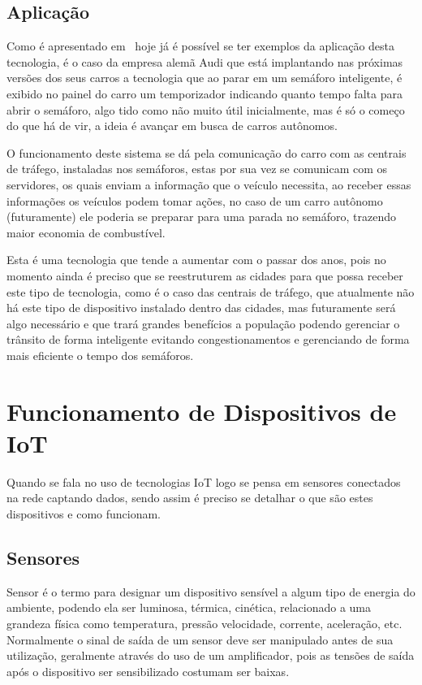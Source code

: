 \subsection{Aplicação}
\label{subsec:aplicacao}
Como é apresentado em~\cite{tecmundo} hoje já é possível se ter exemplos da aplicação desta tecnologia, é o caso da empresa alemã Audi que está implantando nas próximas versões dos seus carros a tecnologia que ao parar em um semáforo inteligente, é exibido no painel do carro um temporizador indicando quanto tempo falta para abrir o semáforo, algo tido como não muito útil inicialmente, mas é só o começo do que há de vir, a ideia é avançar em busca de carros autônomos. 

O funcionamento deste sistema se dá pela comunicação do carro com as centrais de tráfego, instaladas nos semáforos, estas por sua vez se comunicam com os servidores, os quais enviam a informação que o veículo necessita, ao receber essas informações os veículos podem tomar ações, no caso de um carro autônomo (futuramente) ele poderia se preparar para uma parada no semáforo, trazendo maior economia de combustível.

Esta é uma tecnologia que tende a aumentar com o passar dos anos, pois no momento ainda é preciso que se reestruturem as cidades para que possa receber este tipo de tecnologia, como é o caso das centrais de tráfego, que atualmente não há este tipo de dispositivo instalado dentro das cidades, mas futuramente será algo necessário e que trará grandes benefícios a população podendo gerenciar o trânsito de forma inteligente evitando congestionamentos e gerenciando de forma mais eficiente o tempo dos semáforos.

\section{Funcionamento de Dispositivos de IoT}
\label{sec:dispositivosiot}
Quando se fala no uso de tecnologias IoT logo se pensa em sensores conectados na rede captando dados, sendo assim é preciso se detalhar o que são estes dispositivos e como funcionam.

\subsection{Sensores}
\label{subsec:sensores}
Sensor é o termo para designar um dispositivo sensível a algum tipo de energia do ambiente, podendo ela ser luminosa, térmica, cinética, relacionado a uma grandeza física como temperatura, pressão velocidade, corrente, aceleração, etc. Normalmente o sinal de saída de um sensor deve ser manipulado antes de sua utilização, geralmente através do uso de um amplificador, pois as tensões de saída após o dispositivo ser sensibilizado costumam ser baixas.~\cite{wendling2010}


